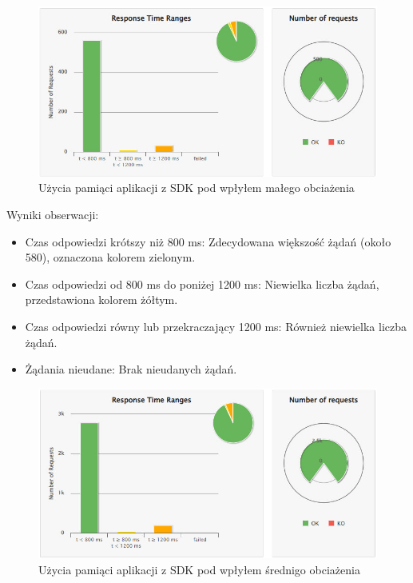 \documentclass[runningheads,12pt]{llncs}
\begin{document}
\begin{figure}
    \includegraphics[width=\linewidth]{images/library-gatling-low-graph.jpg}
    \caption{Użycia pamiąci aplikacji z SDK pod wpłyłem małego obciażenia} \label{fig1}
\end{figure}

Wyniki obserwacji:

\begin{itemize} 
    \item Czas odpowiedzi krótszy niż 800 ms: Zdecydowana większość żądań (około 580), oznaczona kolorem zielonym. 
    \item Czas odpowiedzi od 800 ms do poniżej 1200 ms: Niewielka liczba żądań, przedstawiona kolorem żółtym. 
    \item Czas odpowiedzi równy lub przekraczający 1200 ms: Również niewielka liczba żądań. 
    \item Żądania nieudane: Brak nieudanych żądań. 
\end{itemize}

\begin{figure}
    \includegraphics[width=\linewidth]{images/library-gatling-middle-graph.jpg}
    \caption{Użycia pamiąci aplikacji z SDK pod wpłyłem średnigo obciażenia} \label{fig1}
\end{figure}
\end{document}
